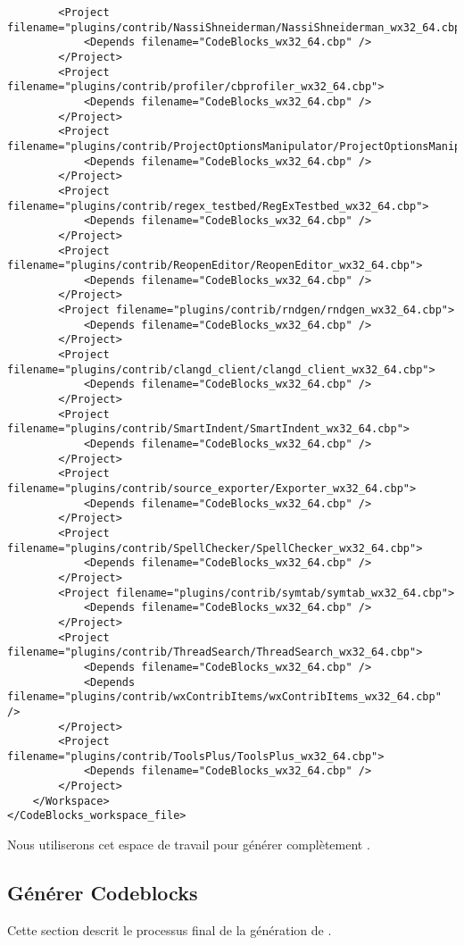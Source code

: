 {\begin{verbatim}
		<Project filename="plugins/contrib/NassiShneiderman/NassiShneiderman_wx32_64.cbp">
			<Depends filename="CodeBlocks_wx32_64.cbp" />
		</Project>
		<Project filename="plugins/contrib/profiler/cbprofiler_wx32_64.cbp">
			<Depends filename="CodeBlocks_wx32_64.cbp" />
		</Project>
		<Project filename="plugins/contrib/ProjectOptionsManipulator/ProjectOptionsManipulator_wx32_64.cbp">
			<Depends filename="CodeBlocks_wx32_64.cbp" />
		</Project>
		<Project filename="plugins/contrib/regex_testbed/RegExTestbed_wx32_64.cbp">
			<Depends filename="CodeBlocks_wx32_64.cbp" />
		</Project>
		<Project filename="plugins/contrib/ReopenEditor/ReopenEditor_wx32_64.cbp">
			<Depends filename="CodeBlocks_wx32_64.cbp" />
		</Project>
		<Project filename="plugins/contrib/rndgen/rndgen_wx32_64.cbp">
			<Depends filename="CodeBlocks_wx32_64.cbp" />
		</Project>
		<Project filename="plugins/contrib/clangd_client/clangd_client_wx32_64.cbp">
			<Depends filename="CodeBlocks_wx32_64.cbp" />
		</Project>
		<Project filename="plugins/contrib/SmartIndent/SmartIndent_wx32_64.cbp">
			<Depends filename="CodeBlocks_wx32_64.cbp" />
		</Project>
		<Project filename="plugins/contrib/source_exporter/Exporter_wx32_64.cbp">
			<Depends filename="CodeBlocks_wx32_64.cbp" />
		</Project>
		<Project filename="plugins/contrib/SpellChecker/SpellChecker_wx32_64.cbp">
			<Depends filename="CodeBlocks_wx32_64.cbp" />
		</Project>
		<Project filename="plugins/contrib/symtab/symtab_wx32_64.cbp">
			<Depends filename="CodeBlocks_wx32_64.cbp" />
		</Project>
		<Project filename="plugins/contrib/ThreadSearch/ThreadSearch_wx32_64.cbp">
			<Depends filename="CodeBlocks_wx32_64.cbp" />
			<Depends filename="plugins/contrib/wxContribItems/wxContribItems_wx32_64.cbp" />
		</Project>
		<Project filename="plugins/contrib/ToolsPlus/ToolsPlus_wx32_64.cbp">
			<Depends filename="CodeBlocks_wx32_64.cbp" />
		</Project>
	</Workspace>
</CodeBlocks_workspace_file>
\end{verbatim}
}


Nous utiliserons cet espace de travail pour générer complètement \codeblocks.


\subsection{Générer Codeblocks}

Cette section descrit le processus final de la génération de \codeblocks.

